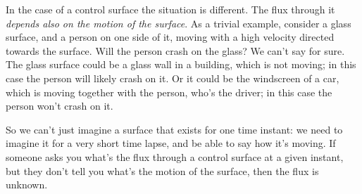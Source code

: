 \documentclass[a4paper,12pt,%
onecolumn,oneside,titlepage,%
british%
]{memoir}
\renewcommand*{\|}[1][]{\nonscript\:#1\vert\nonscript\:\mathopen{}}
\begin{document}
%
In the case of a control surface the situation is different. The flux through it \emph{depends also on the motion of the surface}. As a trivial example, consider a glass surface, and a person on one side of it, moving with a high velocity directed towards the surface. Will the person crash on the glass? We can't say for sure. The glass surface could be a glass wall in a building, which is not moving; in this case the person will likely crash on it. Or it could be the windscreen of a car, which is moving together with the person, who's the driver; in this case the person won't crash on it.

So we can't just imagine a surface that exists for one time instant: we need to imagine it for a very short time lapse, and be able to say how it's moving. If someone asks you what's the flux through a control surface at a given instant, but they don't tell you what's the motion of the surface, then the flux is unknown.


\smallskip
\end{document}
